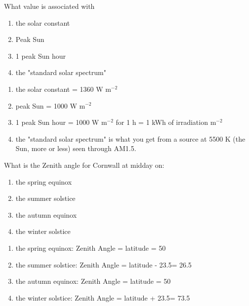 \documentclass{article} %
\begin{document}
\begin{question}
What value is associated with
    \begin{enumerate}[label=\alph*)]
        \item the solar constant
        \item Peak Sun
        \item 1 peak Sun hour
        \item the "standard solar spectrum"
    \end{enumerate}
\end{question}
\begin{solution}
    \begin{enumerate}[label=\alph*)]
        \item the solar constant = 1360 W m$^{-2}$
        \item peak Sun = 1000 W m$^{-2}$
        \item 1 peak Sun hour = 1000 W m$^{-2}$ for 1 h = 1 kWh of irradiation m$^{-2}$
        \item the "standard solar spectrum" is what you get from a source at 5500 K (the Sun, more or less) seen through AM1.5.
    \end{enumerate}
\end{solution}

\begin{question}
What is the Zenith angle for Cornwall at midday on:
    \begin{enumerate}[label=\alph*)]
        \item the spring equinox
        \item the summer solstice
        \item the autumn equinox
        \item the winter solstice
    \end{enumerate}
\end{question}
\begin{solution}
    \begin{enumerate}[label=\alph*)]
        \item the spring equinox: Zenith Angle = latitude = 50\degree
        \item the summer solstice: Zenith Angle = latitude - 23.5\degree = 26.5\degree
        \item the autumn equinox: Zenith Angle = latitude = 50\degree
        \item the winter solstice: Zenith Angle = latitude + 23.5\degree = 73.5\degree
    \end{enumerate}
\end{solution}
\end{document}
